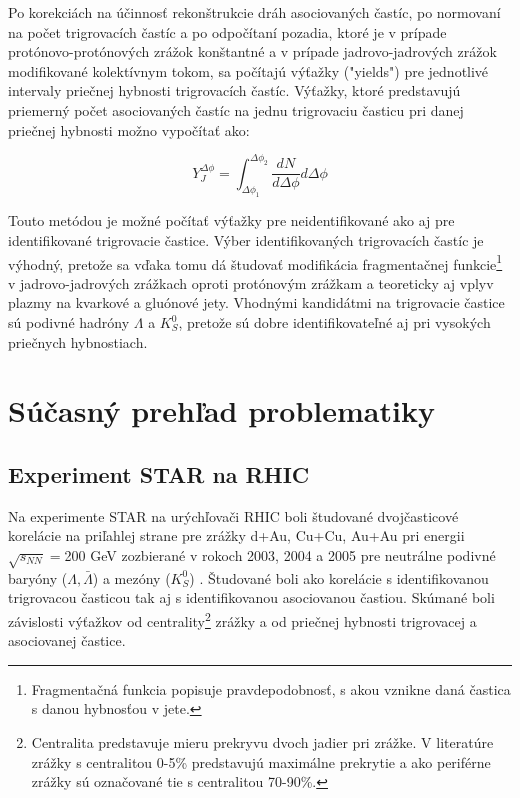 \documentclass[thesismargins, thesislinespacing]{rnthesis}
\begin{document}
Po korekciách na účinnosť rekonštrukcie dráh asociovaných častíc, po normovaní na počet trigrovacích častíc a po odpočítaní pozadia, ktoré je v prípade protónovo-protónových zrážok konštantné a v prípade jadrovo-jadrových zrážok modifikované kolektívnym tokom, sa počítajú výťažky ("yields") pre jednotlivé intervaly priečnej hybnosti trigrovacích častíc. Výťažky, ktoré predstavujú priemerný počet asociovaných častíc na jednu trigrovaciu časticu pri danej priečnej hybnosti možno vypočítať ako:

\begin{equation}
Y_J^{\Delta\phi}=\int_{\Delta \phi_1}^{\Delta \phi_2} \frac{dN}{d\Delta \phi } d\Delta\phi 
\label{yield}
\end{equation} 

Touto metódou je možné počítať výťažky pre neidentifikované ako aj pre identifikované trigrovacie častice. Výber identifikovaných trigrovacích častíc je výhodný, pretože sa vďaka tomu dá študovať modifikácia fragmentačnej funkcie\footnote{Fragmentačná funkcia popisuje pravdepodobnosť, s akou vznikne daná častica s danou hybnosťou v jete.} v jadrovo-jadrových zrážkach oproti protónovým zrážkam a teoreticky aj vplyv plazmy na kvarkové a gluónové jety. Vhodnými kandidátmi na trigrovacie častice sú podivné hadróny $\Lambda$ a $K^0_S$, pretože sú dobre identifikovateľné aj pri vysokých priečnych hybnostiach. 

\section{Súčasný prehľad problematiky}
\subsection{Experiment STAR na RHIC}
Na experimente STAR na urýchľovači RHIC boli študované dvojčasticové korelácie na priľahlej strane pre zrážky d+Au, Cu+Cu, Au+Au pri energii $\sqrt{s_{NN}}=$200 GeV zozbierané v rokoch 2003, 2004 a 2005 pre neutrálne podivné baryóny ($\Lambda , \bar{\Lambda}$) a mezóny ($K^0_S$) \cite{clanokstar}. Študované boli ako korelácie s identifikovanou trigrovacou časticou tak aj s identifikovanou asociovanou častiou. Skúmané boli závislosti výťažkov od centrality\footnote{Centralita predstavuje mieru prekryvu dvoch jadier pri zrážke. V literatúre zrážky s centralitou 0-5\% predstavujú maximálne prekrytie a ako periférne zrážky sú označované tie s centralitou 70-90\%.} zrážky a od priečnej hybnosti trigrovacej a asociovanej častice.
\end{document}
